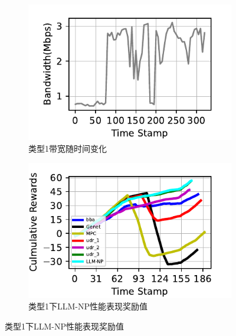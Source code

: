 \begin{figure}[ht]
\centering
\begin{subfigure}[t]{0.47\linewidth}
  \centering
  \includegraphics[width=\linewidth]{figures/chap04/evaluation_multialgo/bandwidth_68_plot.pdf}
  \caption{类型1带宽随时间变化}
  \label{type1-band-eva}
\end{subfigure}%
\begin{subfigure}[t]{0.47\linewidth}
  \centering
  \includegraphics[width=\linewidth]{figures/chap04/evaluation_multialgo/test_68_plot.pdf}
  \caption{类型1下LLM-NP性能表现奖励值}
  \label{type1-rew-eva}
\end{subfigure}


\end{figure}
